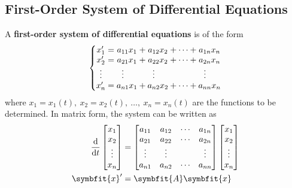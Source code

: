 \documentclass{article}
\begin{document}
\subsection{First-Order System of Differential Equations}
\begin{definition}
    A \textbf{first-order system of differential equations} is of the
    form
    \begin{equation*}
        \left\{
        \setlength\arraycolsep{0pt}
        \begin{array}{ c >{{}}c<{{}} c >{{}}c<{{}} c >{{}}c<{{}} c >{{}}c<{{}} c  }
            x'_1               & = & a_{11}x_1                         & + & a_{12}x_2                         & + & \cdots & + & a_{1n}x_n                         \\
            x'_2               & = & a_{21}x_1                         & + & a_{22}x_2                         & + & \cdots & + & a_{2n}x_n                         \\
            \vdotswithin{x'_3} &   & \vdotswithin{a_{31}}\phantom{x_1} &   & \vdotswithin{a_{32}}\phantom{x_2} &   &        &   & \vdotswithin{a_{3n}}\phantom{x_n} \\
            x'_n               & = & a_{n1}x_1                         & + & a_{n2}x_2                         & + & \cdots & + & a_{nn}x_n
        \end{array}
        \right.
    \end{equation*}
    where \(x_1=x_1(t),\: x_2=x_2(t),\: \dots,\: x_n=x_n(t)\) are the
    functions to be determined. In matrix form, the system can be
    written as
    \begin{align*}
        \dv{t}
        \begin{bmatrix}
            x_1    \\
            x_2    \\
            \vdots \\
            x_n
        \end{bmatrix}
                     & =
        \begin{bmatrix}
            a_{11} & a_{12} & \cdots & a_{1n} \\
            a_{21} & a_{22} & \cdots & a_{2n} \\
            \vdots & \vdots &        & \vdots \\
            a_{n1} & a_{n2} & \cdots & a_{nn}
        \end{bmatrix}
        \begin{bmatrix}
            x_1    \\
            x_2    \\
            \vdots \\
            x_n
        \end{bmatrix}                           \\
        \symbfit{x}' & = \symbfit{A} \symbfit{x}
    \end{align*}
\end{definition}
\end{document}

